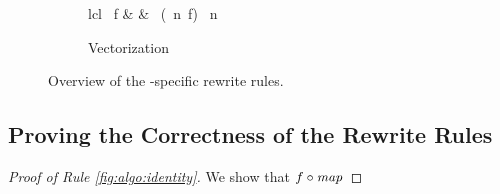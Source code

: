 \begin{figure}[t]
\vspace{\ruleSpace}
\begin{subfigure}[b]{1\linewidth}
  \begin{mdframed}
    \vspace{-\bigskipamount}
    \begin{rerule*}{lcl}
      \map\ f
        & \rightarrow &
          \asScalar
            \circ \map\ (\vect\ n\ f)
            \circ \asVector\ n
    \end{rerule*}
  \end{mdframed}
  \vspace{-1em}
  \caption{Vectorization}
  \label{fig:low:vect}
\end{subfigure}

\caption{Overview of the \OpenCL-specific rewrite rules.}
\label{fig:lowRules}
\end{figure}

\FloatBarrier



\subsection{Proving the Correctness of the Rewrite Rules}
\label{section:rules:proofs}



\begin{proof}[Proof of Rule \ref{fig:algo:identity}]
  We show that $f \circ \text{\textit{map}}$
\end{proof}

%
%

